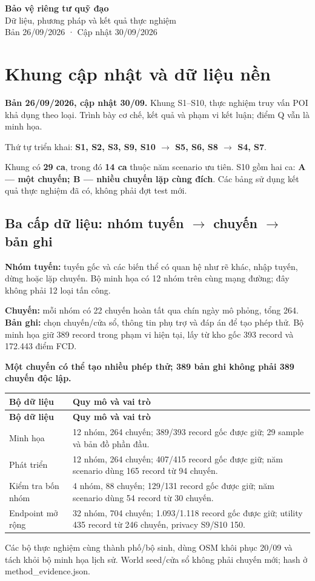 \documentclass[10pt,a4paper]{article}
\newcommand{\key}[1]{\par\smallskip\noindent\colorbox{pale}{\parbox{\dimexpr\linewidth-2\fboxsep}{\textbf{#1}}}\par\smallskip}
\begin{document}
\begin{center}{\LARGE\bfseries\color{ink}Bảo vệ riêng tư quỹ đạo}\\[5pt]{\large Dữ liệu, phương pháp và kết quả thực nghiệm}\\[4pt]{\small Bản 26/09/2026 · Cập nhật 30/09/2026}\end{center}
\section{Khung cập nhật và dữ liệu nền}
\textbf{Bản 26/09/2026, cập nhật 30/09.} Khung S1–S10, thực nghiệm truy vấn POI khả dụng theo loại. Trình bày cơ chế, kết quả và phạm vi kết luận; điểm Q vẫn là minh họa.

Thứ tự triển khai: \textbf{S1, S2, S3, S9, S10 $\to$ S5, S6, S8 $\to$ S4, S7}.

Khung có \textbf{29 ca}, trong đó \textbf{14 ca} thuộc năm scenario ưu tiên. S10 gồm hai ca: \textbf{A — một chuyến; B — nhiều chuyến lặp cùng đích}. Các bảng sử dụng kết quả thực nghiệm đã có, không phải đợt test mới.

\subsection{Ba cấp dữ liệu: nhóm tuyến $\to$ chuyến $\to$ bản ghi}
\textbf{Nhóm tuyến:} tuyến gốc và các biến thể có quan hệ như rẽ khác, nhập tuyến, dừng hoặc lặp chuyến. Bộ minh họa có 12 nhóm trên cùng mạng đường; đây không phải 12 loại tấn công.

\textbf{Chuyến:} mỗi nhóm có 22 chuyến hoàn tất qua chín ngày mô phỏng, tổng 264. \textbf{Bản ghi:} chọn chuyến/cửa sổ, thông tin phụ trợ và đáp án để tạo phép thử. Bộ minh họa giữ 389 record trong phạm vi hiện tại, lấy từ kho gốc 393 record và 172.443 điểm FCD.

\key{Một chuyến có thể tạo nhiều phép thử; 389 bản ghi không phải 389 chuyến độc lập.}

\begingroup\small
\begin{longtable}{@{}P{4.004cm}P{12.914cm}@{}}
\toprule
\textbf{Bộ dữ liệu} & \textbf{Quy mô và vai trò}\\\midrule
\endfirsthead
\toprule
\textbf{Bộ dữ liệu} & \textbf{Quy mô và vai trò}\\\midrule
\endhead
\bottomrule\endfoot
Minh họa & 12 nhóm, 264 chuyến; 389/393 record gốc được giữ; 29 sample và bản đồ phần đầu.\\
\addlinespace[3pt]
Phát triển & 12 nhóm, 264 chuyến; 407/415 record gốc được giữ; năm scenario dùng 165 record từ 94 chuyến.\\
\addlinespace[3pt]
Kiểm tra bốn nhóm & 4 nhóm, 88 chuyến; 129/131 record gốc được giữ; năm scenario dùng 54 record từ 30 chuyến.\\
\addlinespace[3pt]
Endpoint mở rộng & 32 nhóm, 704 chuyến; 1.093/1.118 record gốc được giữ; utility 435 record từ 246 chuyến, privacy S9/S10 150.\\
\end{longtable}
\endgroup
Các bộ thực nghiệm cùng thành phố/bộ sinh, dùng OSM khôi phục 20/09 và tách khỏi bộ minh họa lịch sử. World seed/cửa sổ không phải chuyến mới; hash ở method\_\allowbreak{}evidence.json.
\end{document}
